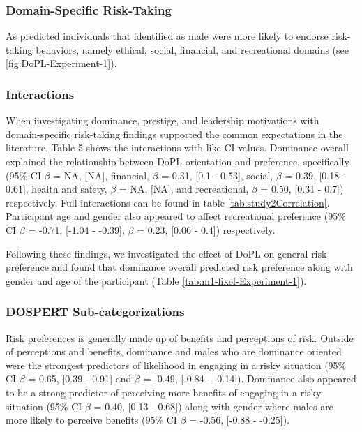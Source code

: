 \documentclass[
  donotrepeattitle,doc, 12pt, a4paper,floatsintext]{apa7}
\begin{document}
\hypertarget{domain-specific-risk-taking}{%
\subsubsection{Domain-Specific Risk-Taking}\label{domain-specific-risk-taking}}

As predicted individuals that identified as male were more likely to endorse risk-taking behaviors, namely ethical, social, financial, and recreational domains (see \ref{fig:DoPL-Experiment-1}).

\hypertarget{interactions}{%
\subsubsection{Interactions}\label{interactions}}

When investigating dominance, prestige, and leadership motivations with domain-specific risk-taking findings supported the common expectations in the literature. Table 5 shows the interactions with like CI values. Dominance overall explained the relationship between DoPL orientation and preference, specifically (95\% CI \(\beta\) = NA, {[}NA{]}, financial, \(\beta\) = 0.31, {[}0.1 - 0.53{]}, social, \(\beta\) = 0.39, {[}0.18 - 0.61{]}, health and safety, \(\beta\) = NA, {[}NA{]}, and recreational, \(\beta\) = 0.50, {[}0.31 - 0.7{]}) respectively. Full interactions can be found in table \ref{tab:study2Correlation}. Participant age and gender also appeared to affect recreational preference (95\% CI \(\beta\) = -0.71, {[}-1.04 - -0.39{]}, \(\beta\) = 0.23, {[}0.06 - 0.4{]}) respectively.

Following these findings, we investigated the effect of DoPL on general risk preference and found that dominance overall predicted risk preference along with gender and age of the participant (Table \ref{tab:m1-fixef-Experiment-1}).

\hypertarget{dospert-sub-categorizations}{%
\subsubsection{DOSPERT Sub-categorizations}\label{dospert-sub-categorizations}}

Risk preferences is generally made up of benefits and perceptions of risk. Outside of perceptions and benefits, dominance and males who are dominance oriented were the strongest predictors of likelihood in engaging in a risky situation (95\% CI \(\beta\) = 0.65, {[}0.39 - 0.91{]} and \(\beta\) = -0.49, {[}-0.84 - -0.14{]}). Dominance also appeared to be a strong predictor of perceiving more benefits of engaging in a risky situation (95\% CI \(\beta\) = 0.40, {[}0.13 - 0.68{]}) along with gender where males are more likely to perceive benefits (95\% CI \(\beta\) = -0.56, {[}-0.88 - -0.25{]}).
\end{document}
